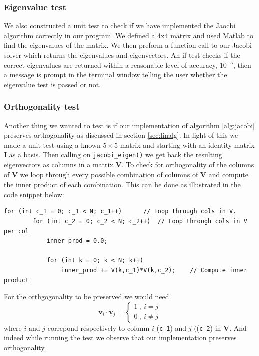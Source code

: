 \documentclass[12pt]{article}
\numberwithin{figure}{section}
\numberwithin{table}{section}
\begin{document}
\subsubsection{Eigenvalue test}
We also constructed a unit test to check if we have implemented the Jaocbi algorithm correctly in our program. We defined a 4x4 matrix and used Matlab to find the eigenvalues of the matrix. We then preform a function call to our Jacobi solver which returns the eigenvalues and eigenvectors. An if test checks if the correct eigenvalues are returned within a reasonable level of accuracy, $10^{-5}$, then a message is prompt in the terminal window telling the user whether the eigenvalue test is passed or not.

\subsubsection{Orthogonality test}
Another thing we wanted to test is if our implementation of algorithm \ref{alg:jacobi} preserves orthogonality as discussed in section \ref{sec:linalg}. In light of this we made a unit test using a known $5\times 5$ matrix and starting with an identity matrix $\mathbf{I}$ as a basis. Then calling on \texttt{jacobi\_eigen()} we get back the resulting eigenvectors as columns in a matrix $\mathbf{V}$. To check for orthogonality of the columns of $\mathbf{V}$ we loop through every possible combination of columns of $\mathbf{V}$ and compute the inner product of each combination. This can be done as illustrated in the code snippet below: \\

\begin{lstlisting}[backgroundcolor=\color{mygray}, frame=single, showstringspaces=false, xleftmargin=\parindent, xrightmargin=\parindent]
	for (int c_1 = 0; c_1 < N; c_1++)      // Loop through cols in V.
        for (int c_2 = 0; c_2 < N; c_2++)  // Loop through cols in V per col
            inner_prod = 0.0;

            for (int k = 0; k < N; k++)
                inner_prod += V(k,c_1)*V(k,c_2);    // Compute inner product
\end{lstlisting}

\noindent For the orthgogonality to be preserved we would need
\begin{equation}
	\mathbf{v}_{i}\cdot\mathbf{v}_j=
	\begin{cases}
			1 \ , \ i=j\\
			0 \ , \ i\neq j
		\end{cases}
\end{equation}
where $i$ and $j$ correpond respectively to column $i$ (\texttt{c\_1}) and $j$ ((\texttt{c\_2}) in $\mathbf{V}$. And indeed while running the test we observe that our implementation preserves orthogonality.
\end{document}
